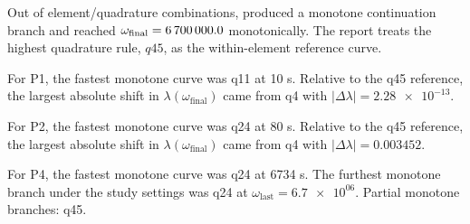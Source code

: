 Out of \StudyRunCount{} element/quadrature combinations, \StudyMonotoneRunCount{} produced a monotone continuation branch and \StudyMonotoneTargetRunCount{} reached $\omega_{\mathrm{final}} = \num{6700000.0}$ monotonically. The report treats the highest quadrature rule, $q45$, as the within-element reference curve.

For P1, the fastest monotone curve was q11 at \num{10} s. Relative to the q45 reference, the largest absolute shift in $\lambda(\omega_{\mathrm{final}})$ came from q4 with $|\Delta\lambda| = \num{2.28e-13}$.

For P2, the fastest monotone curve was q24 at \num{80} s. Relative to the q45 reference, the largest absolute shift in $\lambda(\omega_{\mathrm{final}})$ came from q4 with $|\Delta\lambda| = \num{0.003452}$.

For P4, the fastest monotone curve was q24 at \num{6734} s. The furthest monotone branch under the study settings was q24 at $\omega_{\mathrm{last}} = \num{6.7e+06}$. Partial monotone branches: q45.
